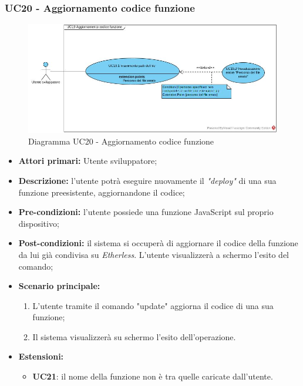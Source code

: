 \subsubsection{UC20 - Aggiornamento codice funzione}
\begin{figure}[h]
	\centering
	\includegraphics[width=\linewidth]{res/img/UC18.jpg}
	\caption{Diagramma UC20 - Aggiornamento codice funzione}
\end{figure}
\begin{itemize}
	\item \textbf{Attori primari:} Utente sviluppatore;
	\item \textbf{Descrizione:} l'utente potrà eseguire nuovamente il \textit{"deploy\glos"} di una sua funzione preesistente, aggiornandone il codice;
	\item \textbf{Pre-condizioni:} l'utente possiede una funzione JavaScript sul proprio dispositivo;
	\item \textbf{Post-condizioni:} il sistema si occuperà di aggiornare il codice della funzione da lui già condivisa su \textit{Etherless}. L'utente visualizzerà a schermo l'esito del comando;
	\item \textbf{Scenario principale:} 
	\begin{enumerate}
		\item L'utente tramite il comando "update" aggiorna il codice di una sua funzione;
		\item Il sistema visualizzerà su schermo l'esito dell'operazione.
	\end{enumerate}
	\item\textbf{Estensioni:}
	\begin{itemize}
		\item \textbf{UC21}: il nome della funzione non è tra quelle caricate dall'utente.
	\end{itemize}
\end{itemize}

